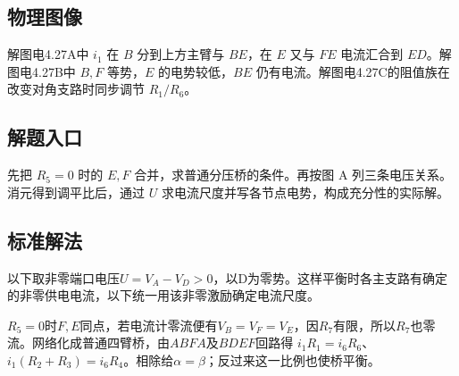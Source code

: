 \documentclass[UTF8,fontset=fandol,a4paper,11pt]{ctexart}
\begin{document}


\subsection*{物理图像}

解图电4.27A中 $i_1$ 在 $B$ 分到上方主臂与 $BE$，在 $E$ 又与 $FE$ 电流汇合到 $ED$。解图电4.27B中 $B,F$ 等势，$E$ 的电势较低，$BE$ 仍有电流。解图电4.27C的阻值族在改变对角支路时同步调节 $R_1/R_6$。



\subsection*{解题入口}

先把 $R_5=0$ 时的 $E,F$ 合并，求普通分压桥的条件。再按图 A 列三条电压关系。消元得到调平比后，通过 $U$ 求电流尺度并写各节点电势，构成充分性的实际解。


\subsection*{标准解法}

以下取非零端口电压$U=V_A-V_D>0$，以D为零势。这样平衡时各主支路有确定的非零供电电流，以下统一用该非零激励确定电流尺度。

$R_5=0$时$F,E$同点，若电流计零流便有$V_B=V_F=V_E$，因$R_7$有限，所以$R_7$也零流。网络化成普通四臂桥，由$ABFA$及$BDEF$回路得
$i_1R_1=i_6R_6$、$i_1(R_2+R_3)=i_6R_4$。相除给$\alpha=\beta$；反过来这一比例也使桥平衡。
\end{document}

